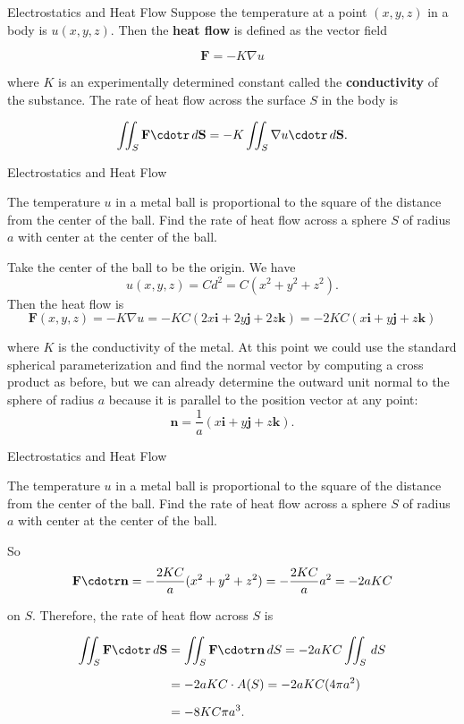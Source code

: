 \documentclass[11pt,english,
handout
]{beamer}
\begin{document}
\begin{frame}{Electrostatics and Heat Flow}
\small
Suppose the temperature at a point $(x,y,z)$ in a body is $u(x,y,z)$. Then the \textbf{heat flow} is defined as the vector field

\[
\mathbf{F}=-K\nabla u
\]

where $K$ is an experimentally determined constant called the \textbf{conductivity} of the substance. \pause The rate of heat flow across the surface $S$ in the body is

\[
\iint_S\mathbf{F}\cdotr\,d\mathbf{S}=-K\iint_S\nabla u\cdotr\,d\mathbf{S}.
\]
\end{frame}












\begin{frame}[t]{Electrostatics and Heat Flow}
\footnotesize
\begin{example}
The temperature $u$ in a metal ball is proportional to the square of the distance from the center of the ball. Find the rate of heat flow across a sphere $S$ of radius $a$ with center at the center of the ball.\pause 

\lspace
Take the center of the ball to be the origin. We have 
\[
u(x,y,z)=Cd^2=C(x^2+y^2+z^2).
\] \pause
Then the heat flow is
\[
\mathbf{F}(x,y,z)=-K\nabla u=-KC(2x\mathbf{i}+2y\mathbf{j}+2z\mathbf{k})=-2KC(x\mathbf{i}+y\mathbf{j}+z\mathbf{k})
\]

where $K$ is the conductivity of the metal. \pause At this point we could use the standard spherical parameterization and find the normal vector by computing a cross product as before, but we can already determine the outward unit normal to the sphere of radius $a$ because it is parallel to the position vector at any point:
\[
\mathbf{n}=\frac{1}{a}(x\mathbf{i}+y\mathbf{j}+z\mathbf{k}).
\] 
\end{example}
\end{frame}








\begin{frame}[t]{Electrostatics and Heat Flow}
\footnotesize
\begin{example}
The temperature $u$ in a metal ball is proportional to the square of the distance from the center of the ball. Find the rate of heat flow across a sphere $S$ of radius $a$ with center at the center of the ball.

\lspace
So 
\[
\mathbf{F}\cdotr\mathbf{n}=-\frac{2KC}{a}(x^2+y^2+z^2)=-\frac{2KC}{a}a^2=-2aKC
\]

on $S$. \pause Therefore, the rate of heat flow across $S$ is

\begin{align*}
\iint_S\mathbf{F}\cdotr\,d\mathbf{S}&=\iint_S\mathbf{F}\cdotr\mathbf{n}\,dS=-2aKC\iint_S\,dS\\[2mm]
&=-2aKC\cdot A(S)=-2aKC(4\pi a^2)\\[2mm]
&=-8KC\pi a^3.
\end{align*}
\end{example}
\end{frame}
\end{document}
